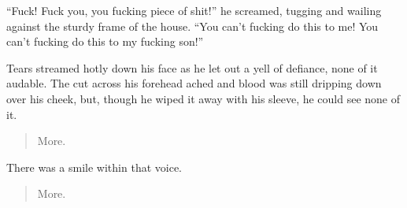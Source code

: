 ``Fuck!  Fuck you, you fucking piece of shit!'' he screamed, tugging and wailing against the sturdy frame of the house.  ``You can't fucking do this to me!  You can't fucking do this to my fucking son!''

Tears streamed hotly down his face as he let out a yell of defiance, none of it audable.  The cut across his forehead ached and blood was still dripping down over his cheek, but, though he wiped it away with his sleeve, he could see none of it.

\begin{quote}
  More.
\end{quote}

There was a smile within that voice.

\begin{quote}
  More.
\end{quote}
